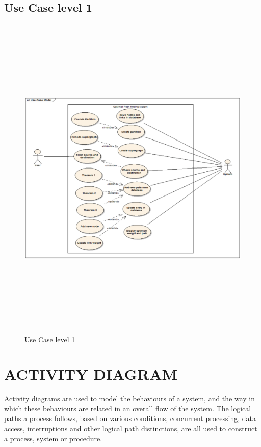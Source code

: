 \begin{center}
\subsection{\small Use Case level 1}
\begin{figure}[H]
\includegraphics[width=15cm,height=16cm]{usecase1.eps}
\caption{Use Case level 1}
\end{figure}
\newpage

\section{\normalsize ACTIVITY DIAGRAM}
\hspace*{5mm}Activity diagrams are used to model the behaviours of a system, and the way in which these behaviours are related in an overall flow of the system. The logical paths a process follows, based on various conditions, concurrent processing, data access, interruptions and other logical path distinctions, are all used to construct a process, system or procedure.\\


\end{center}
